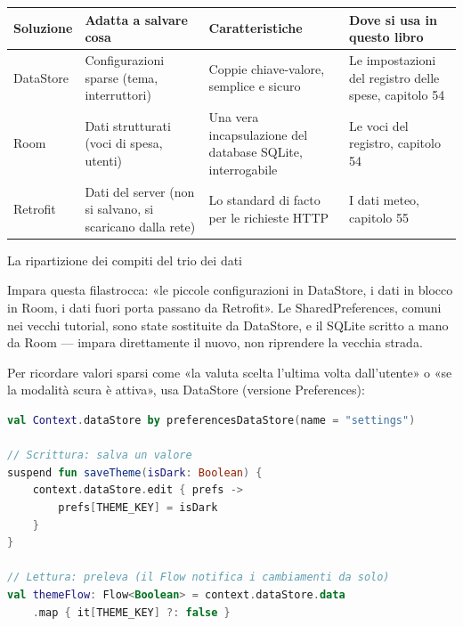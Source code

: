 


\begin{center}
\begin{tabularx}{\linewidth}{|X|X|X|X|}
\hline
\textbf{Soluzione} & \textbf{Adatta a salvare cosa} & \textbf{Caratteristiche} & \textbf{Dove si usa in questo libro} \tabularnewline
\hline
DataStore & Configurazioni sparse (tema, interruttori) & Coppie chiave-valore, semplice e sicuro & Le impostazioni del registro delle spese, capitolo 54 \tabularnewline
Room & Dati strutturati (voci di spesa, utenti) & Una vera incapsulazione del database SQLite, interrogabile & Le voci del registro, capitolo 54 \tabularnewline
Retrofit & Dati del server (non si salvano, si scaricano dalla rete) & Lo standard di facto per le richieste HTTP & I dati meteo, capitolo 55 \tabularnewline
\hline
\end{tabularx}
\end{center}

\begin{center}\small\color{gray}La ripartizione dei compiti del trio dei dati\end{center}

Impara questa filastrocca: «le piccole configurazioni in DataStore, i dati in blocco in Room, i dati fuori porta passano da Retrofit». Le SharedPreferences, comuni nei vecchi tutorial, sono state sostituite da DataStore, e il SQLite scritto a mano da Room — impara direttamente il nuovo, non riprendere la vecchia strada.


Per ricordare valori sparsi come «la valuta scelta l'ultima volta dall'utente» o «se la modalità scura è attiva», usa DataStore (versione Preferences):

\begin{lstlisting}[language=Kotlin]
val Context.dataStore by preferencesDataStore(name = "settings")

// Scrittura: salva un valore
suspend fun saveTheme(isDark: Boolean) {
    context.dataStore.edit { prefs ->
        prefs[THEME_KEY] = isDark
    }
}

// Lettura: preleva (il Flow notifica i cambiamenti da solo)
val themeFlow: Flow<Boolean> = context.dataStore.data
    .map { it[THEME_KEY] ?: false }
\end{lstlisting}

